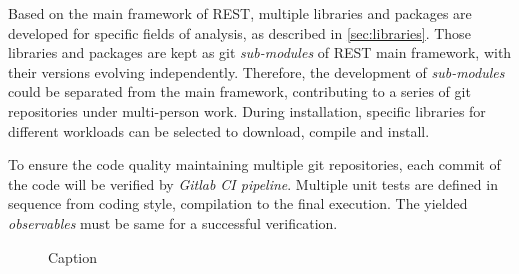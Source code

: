 
Based on the main framework of REST, multiple libraries and packages are developed for specific fields of analysis, as described in \ref{sec:libraries}. Those libraries and packages are kept as git \emph{sub-modules} of REST main framework, with their versions evolving independently. Therefore, the development of \emph{sub-modules} could be separated from the main framework, contributing to a series of git repositories under multi-person work. During installation, specific libraries for different workloads can be selected to download, compile and install.

To ensure the code quality maintaining multiple git repositories, each commit of the code will be verified by \emph{Gitlab CI pipeline}. Multiple unit tests are defined in sequence from coding style, compilation to the final execution. The yielded \emph{observables} must be same for a successful verification.


\begin{figure}[hb!]
  \centering
	\caption{Caption}\label{fig:pipelines}
\end{figure}
